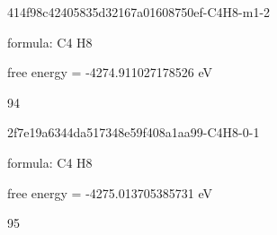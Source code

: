 \documentclass{article}
\begin{document}
\vspace{1cm}


414f98c42405835d32167a01608750ef-C4H8-m1-2



formula: C4 H8



free energy = -4274.911027178526 eV

94

\vspace{1cm}


2f7e19a6344da517348e59f408a1aa99-C4H8-0-1



formula: C4 H8



free energy = -4275.013705385731 eV

95
\end{document}
